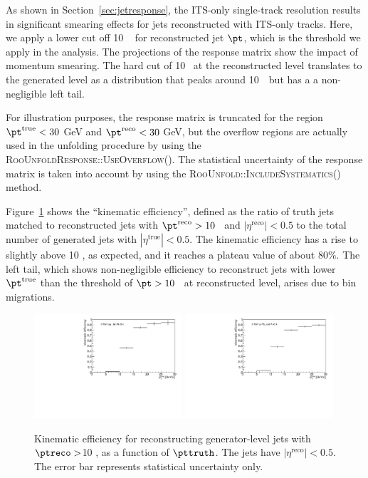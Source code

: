 As shown in Section~\ref{sec:jetresponse}, the ITS-only single-track resolution results in significant smearing effects for jets reconstructed with ITS-only tracks. Here, we apply a lower cut off {10 \GeVc~} for reconstructed jet $\pt$, which is the threshold we apply in the analysis. The projections of the response matrix show the impact of momentum smearing. The hard cut of 10 \GeVc~at the reconstructed level translates to the generated level as a distribution that peaks around 10~\GeVc~but has a a non-negligible left tail.

For illustration purposes, the response matrix is truncated for the region $\pt^{\mathrm{true}}<30$ GeV and $\pt^{\mathrm{reco}}<30$ GeV, but the overflow regions are actually used in the unfolding procedure by using the \textsc{RooUnfoldResponse::UseOverflow()}. The statistical uncertainty of the response matrix is taken into account by using the \textsc{RooUnfold::IncludeSystematics()} method.

Figure~\ref{fig:kinematic_efficiency} shows the ``kinematic efficiency'', defined as the ratio of truth jets matched to reconstructed jets with $\pt^{\mathrm{reco}}>10$ \GeVc~and $|\eta^{\mathrm{reco}}|<0.5$ to the total number of generated jets with $|\eta^{\mathrm{true}}|<0.5$. The kinematic efficiency has a rise to slightly above 10 \GeVc, as expected, and it reaches a plateau value of about 80$\%$. The left tail, which shows non-negligible efficiency to reconstruct jets with lower $\pt^{\mathrm{true}}$ than the threshold of $\pt>10$ \GeVc~at reconstructed level, arises due to bin migrations. 
\begin{figure}
\center
\includegraphics[width=0.49\textwidth]{JetResponse/KinematicEfficiencypp}
\includegraphics[width=0.49\textwidth]{JetResponse/KinematicEfficiencypPb}
\label{fig:kinematic_efficiency}
\caption{Kinematic efficiency for reconstructing generator-level jets with $\ptreco>$10 \GeVc, as a function of $\pttruth$. The jets have $|\eta^{\mathrm{reco}}|<0.5$. The error bar represents statistical uncertainty only. }
\end{figure}

